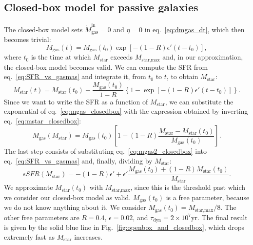 \documentclass[fleqn,usenatbib]{mnras}
\begin{document}
\subsection{Closed-box model for passive galaxies}\label{sec:closed_box}
The closed-box model sets $\dot{M}_\text{gas}^\text{in}=0$ and $\eta=0$ in eq.~\ref{eq:dmgas_dt}, which then becomes trivial:
\begin{equation}
    M_\text{gas}(t) = M_\text{gas}(t_0)\exp{[-(1-R)\epsilon' (t-t_0)]},
	\label{eq:mgas_closedbox}
\end{equation}
where $t_0$ is the time at which $M_{\text{star}}$ exceeds $M_\text{star,max}$ and, in our approximation, the closed-box model becomes valid. We can compute the SFR from eq.~\ref{eq:SFR_vs_gasmas} and integrate it, from $t_0$ to $t$, to obtain $M_{\text{star}}$:
{\fontsize{8.3pt}{8.3pt}\begin{equation}
    M_\text{star}(t) = M_\text{star}(t_0) + \dfrac{M_\text{gas}(t_0)}{1-R}\left\{1-\exp\left[-(1-R)\epsilon' (t-t_0)\right]\right\}.
	\label{eq:mstar_closedbox}
\end{equation}}
Since we want to write the SFR as a function of $M_{\text{star}}$, we can substitute the exponential of eq.~\ref{eq:mgas_closedbox} with the expression obtained by inverting eq.~\ref{eq:mstar_closedbox}:
\begin{equation}
    M_\text{gas}\left(M_\text{star}\right) = M_\text{gas}(t_0)\left[1 - (1-R)\dfrac{M_\text{star} - M_\text{star}(t_0)}{M_\text{gas}(t_0)}\right].
	\label{eq:mgas2_closedbox}
\end{equation}
The last step consists of substituting eq.~\ref{eq:mgas2_closedbox} into eq.~\ref{eq:SFR_vs_gasmas} and, finally, dividing by $M_{\text{star}}$:
\begin{equation}
    sSFR\left(M_\text{star}\right) = -(1-R)\epsilon' + \epsilon' \dfrac{M_\text{gas}(t_0) + (1-R)M_\text{star}(t_0)}{M_\text{star}}.
	\label{eq:sSFR_closedbox}
\end{equation}
We approximate $M_\text{star}(t_0)$ with $M_\text{star,max}$, since this is the threshold past which we consider our closed-box model as valid. $M_\text{gas}(t_0)$ is a free parameter, because we do not know anything about it. We consider $M_\text{gas}(t_0) = M_\text{star,max}/8$. The other free parameters are $R=0.4$, $\epsilon=0.02$, and $\tau_\text{dyn}=2 \times 10^7 \text{yr}$. The final result is given by the solid blue line in Fig.~\ref{fig:openbox_and_closedbox}, which drops extremely fast as $M_\text{star}$ increases. 
\end{document}
